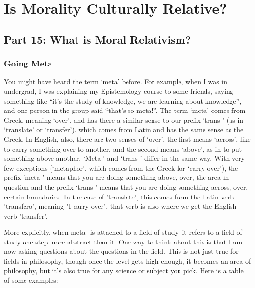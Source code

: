 \part{Is Morality Culturally Relative?}
\label{ch.modseven}

\chapter{Part 15: What is Moral Relativism?}
\section{Going Meta}

You might have heard the term ‘meta’ before. For example, when I was in undergrad, I was explaining my Epistemology course to some friends, saying something like “it’s the study of knowledge, we are learning about knowledge”, and one person in the group said “that’s so meta!”. The term ‘meta’ comes from Greek, meaning ‘over’, and has there a similar sense to our prefix ‘trans-’ (as in ‘translate’ or ‘transfer’), which comes from Latin and has the same sense as the Greek. In English, also, there are two senses of ‘over’, the first means ‘across’, like to carry something over to another, and the second means ‘above’, as in to put something above another. ‘Meta-’ and ‘trans-’ differ in the same way. With very few exceptions (‘metaphor’, which comes from the Greek for ‘carry over’), the prefix ‘meta-’ means that you are doing something above, over, the area in question and the prefix ‘trans-’ means that you are doing something across, over, certain boundaries. In the case of 'translate', this comes from the Latin verb 'transfero', meaning "I carry over", that verb is also where we get the English verb 'transfer'.

More explicitly, when \gls{meta-} is attached to a field of study, it refers to a field of study one step more abstract than it. One way to think about this is that I am now asking questions about the questions in the field. This is not just true for fields in philosophy, though once the level gets high enough, it becomes an area of philosophy, but it’s also true for any science or subject you pick. Here is a table of some examples:

